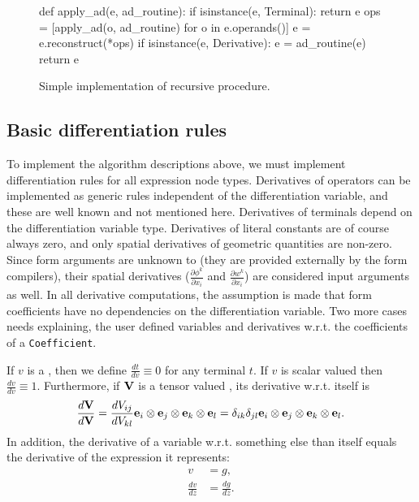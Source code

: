 
\begin{figure}[ht]
\begin{python}
def apply_ad(e, ad_routine):
    if isinstance(e, Terminal):
        return e
    ops = [apply_ad(o, ad_routine) for o in e.operands()]
    e = e.reconstruct(*ops)
    if isinstance(e, Derivative):
        e = ad_routine(e)
    return e
\end{python}
\caption{Simple implementation of recursive  procedure.}
\label{ufl:fig:applyad}
\end{figure}

\subsection{Basic differentiation rules}

To implement the algorithm descriptions above, we must implement
differentiation rules for all expression node types. Derivatives of
operators can be implemented as generic rules independent of the
differentiation variable, and these are well known and not mentioned
here. Derivatives of terminals depend on the differentiation variable
type.  Derivatives of literal constants are of course always zero, and
only spatial derivatives of geometric quantities are non-zero.  Since
form arguments are unknown to \ufl{} (they are provided externally by
the form compilers), their spatial derivatives ($\frac{\partial
  \phi^k}{\partial x_i}$ and $\frac{\partial w^k}{\partial x_i}$) are
considered input arguments as well.  In all derivative computations,
the assumption is made that form coefficients have no dependencies on
the differentiation variable.  Two more cases needs explaining, the
user defined variables and derivatives w.r.t. the coefficients of a
\texttt{Coefficient}.

If $v$ is a , then we define $\frac{d t}{d v} \equiv
0$ for any terminal $t$. If $v$ is scalar valued then $\frac{d v}{d v}
\equiv 1$. Furthermore, if $\mathbf{V}$ is a tensor valued ,
its derivative w.r.t. itself is
\begin{align}
\frac{d \mathbf{V}}{d \mathbf{V}}
    =
    \frac{d V_{ij}}{d V_{kl}}
    \mathbf{e}_i\otimes\mathbf{e}_j\otimes\mathbf{e}_k\otimes\mathbf{e}_l
    =
    \delta_{ik}\delta_{jl}
    \mathbf{e}_i\otimes\mathbf{e}_j\otimes\mathbf{e}_k\otimes\mathbf{e}_l .
\end{align}
In addition, the derivative of a variable w.r.t. something else than
itself equals the derivative of the expression it represents:
\begin{align}
v &= g, \\
\frac{d v}{d z} &= \frac{d g}{d z}.
\end{align}

